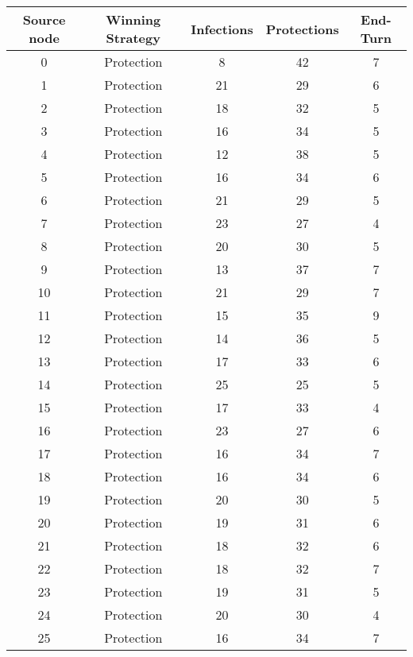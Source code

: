 \documentclass[results.tex]{subfiles}
\begin{document}
\begin{center}
  \begin{tabular}{| c || c | c | c | c |}
    \hline
    {\bfseries Source node} & {\bfseries Winning Strategy} & {\bfseries Infections} & {\bfseries Protections} & {\bfseries End-Turn} \\  %
    \hline\hline
    0 & Protection & 8 & 42 & 7 \\ 
    \hline
    1 & Protection & 21 & 29 & 6 \\ 
    \hline
    2 & Protection & 18 & 32 & 5 \\ 
    \hline
    3 & Protection & 16 & 34 & 5 \\ 
    \hline
    4 & Protection & 12 & 38 & 5 \\ 
    \hline
    5 & Protection & 16 & 34 & 6 \\ 
    \hline
    6 & Protection & 21 & 29 & 5 \\ 
    \hline
    7 & Protection & 23 & 27 & 4 \\ 
    \hline
    8 & Protection & 20 & 30 & 5 \\ 
    \hline
    9 & Protection & 13 & 37 & 7 \\ 
    \hline
    10 & Protection & 21 & 29 & 7 \\ 
    \hline
    11 & Protection & 15 & 35 & 9 \\ 
    \hline
    12 & Protection & 14 & 36 & 5 \\ 
    \hline
    13 & Protection & 17 & 33 & 6 \\ 
    \hline
    14 & Protection & 25 & 25 & 5 \\ 
    \hline
    15 & Protection & 17 & 33 & 4 \\ 
    \hline
    16 & Protection & 23 & 27 & 6 \\ 
    \hline
    17 & Protection & 16 & 34 & 7 \\ 
    \hline
    18 & Protection & 16 & 34 & 6 \\ 
    \hline
    19 & Protection & 20 & 30 & 5 \\ 
    \hline
    20 & Protection & 19 & 31 & 6 \\ 
    \hline
    21 & Protection & 18 & 32 & 6 \\ 
    \hline
    22 & Protection & 18 & 32 & 7 \\ 
    \hline
    23 & Protection & 19 & 31 & 5 \\ 
    \hline
    24 & Protection & 20 & 30 & 4 \\ 
    \hline
    25 & Protection & 16 & 34 & 7 \\ 

\end{tabular}
\end{center}
\end{document}
